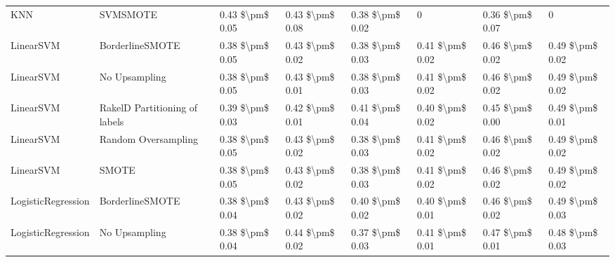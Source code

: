 \begin{tabular}{llllllll}
                            KNN &                      SVMSMOTE & 0.43 \$\textbackslash pm\$ 0.05 &           0.43 \$\textbackslash pm\$ 0.08 &       0.38 \$\textbackslash pm\$ 0.02 &                      0 &                         0.36 \$\textbackslash pm\$ 0.07 &                   0 \\
                      LinearSVM &               BorderlineSMOTE & 0.38 \$\textbackslash pm\$ 0.05 &           0.43 \$\textbackslash pm\$ 0.02 &       0.38 \$\textbackslash pm\$ 0.03 &        0.41 \$\textbackslash pm\$ 0.02 &                         0.46 \$\textbackslash pm\$ 0.02 &     0.49 \$\textbackslash pm\$ 0.02 \\
                      LinearSVM &                 No Upsampling & 0.38 \$\textbackslash pm\$ 0.05 &           0.43 \$\textbackslash pm\$ 0.01 &       0.38 \$\textbackslash pm\$ 0.03 &        0.41 \$\textbackslash pm\$ 0.02 &                         0.46 \$\textbackslash pm\$ 0.02 &     0.49 \$\textbackslash pm\$ 0.02 \\
                      LinearSVM & RakelD Partitioning of labels & 0.39 \$\textbackslash pm\$ 0.03 &           0.42 \$\textbackslash pm\$ 0.01 &       0.41 \$\textbackslash pm\$ 0.04 &        0.40 \$\textbackslash pm\$ 0.02 &                         0.45 \$\textbackslash pm\$ 0.00 &     0.49 \$\textbackslash pm\$ 0.01 \\
                      LinearSVM &           Random Oversampling & 0.38 \$\textbackslash pm\$ 0.05 &           0.43 \$\textbackslash pm\$ 0.02 &       0.38 \$\textbackslash pm\$ 0.03 &        0.41 \$\textbackslash pm\$ 0.02 &                         0.46 \$\textbackslash pm\$ 0.02 &     0.49 \$\textbackslash pm\$ 0.02 \\
                      LinearSVM &                         SMOTE & 0.38 \$\textbackslash pm\$ 0.05 &           0.43 \$\textbackslash pm\$ 0.02 &       0.38 \$\textbackslash pm\$ 0.03 &        0.41 \$\textbackslash pm\$ 0.02 &                         0.46 \$\textbackslash pm\$ 0.02 &     0.49 \$\textbackslash pm\$ 0.02 \\
             LogisticRegression &               BorderlineSMOTE & 0.38 \$\textbackslash pm\$ 0.04 &           0.43 \$\textbackslash pm\$ 0.02 &       0.40 \$\textbackslash pm\$ 0.02 &        0.40 \$\textbackslash pm\$ 0.01 &                         0.46 \$\textbackslash pm\$ 0.02 &     0.49 \$\textbackslash pm\$ 0.03 \\
             LogisticRegression &                 No Upsampling & 0.38 \$\textbackslash pm\$ 0.04 &           0.44 \$\textbackslash pm\$ 0.02 &       0.37 \$\textbackslash pm\$ 0.03 &        0.41 \$\textbackslash pm\$ 0.01 &                         0.47 \$\textbackslash pm\$ 0.01 &     0.48 \$\textbackslash pm\$ 0.03 \\

\end{tabular}
